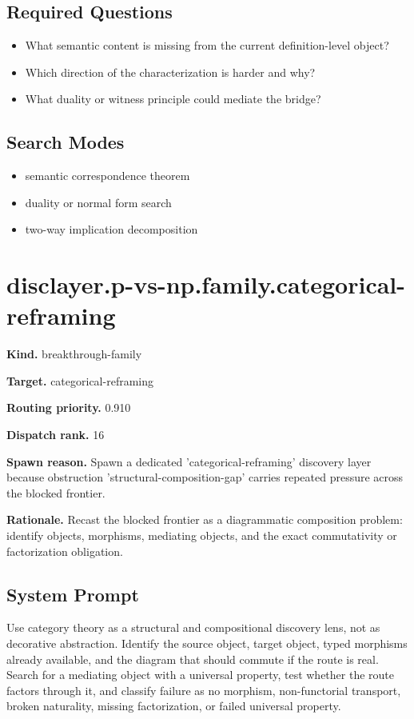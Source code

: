 \documentclass[11pt]{article}
\begin{document}
\subsection*{Required Questions}
\begin{itemize}[leftmargin=*,itemsep=0.2em]
\item What semantic content is missing from the current definition-level object?
\item Which direction of the characterization is harder and why?
\item What duality or witness principle could mediate the bridge?
\end{itemize}
\subsection*{Search Modes}
\begin{itemize}[leftmargin=*,itemsep=0.2em]
\item semantic correspondence theorem
\item duality or normal form search
\item two-way implication decomposition
\end{itemize}
\section{disclayer.p-vs-np.family.categorical-reframing}
\textbf{Kind.} breakthrough-family

\textbf{Target.} categorical-reframing

\textbf{Routing priority.} 0.910

\textbf{Dispatch rank.} 16

\textbf{Spawn reason.} Spawn a dedicated 'categorical-reframing' discovery layer because obstruction 'structural-composition-gap' carries repeated pressure across the blocked frontier.

\textbf{Rationale.} Recast the blocked frontier as a diagrammatic composition problem: identify objects, morphisms, mediating objects, and the exact commutativity or factorization obligation.

\subsection*{System Prompt}
Use category theory as a structural and compositional discovery lens, not as decorative abstraction. Identify the source object, target object, typed morphisms already available, and the diagram that should commute if the route is real. Search for a mediating object with a universal property, test whether the route factors through it, and classify failure as no morphism, non-functorial transport, broken naturality, missing factorization, or failed universal property.
\end{document}

